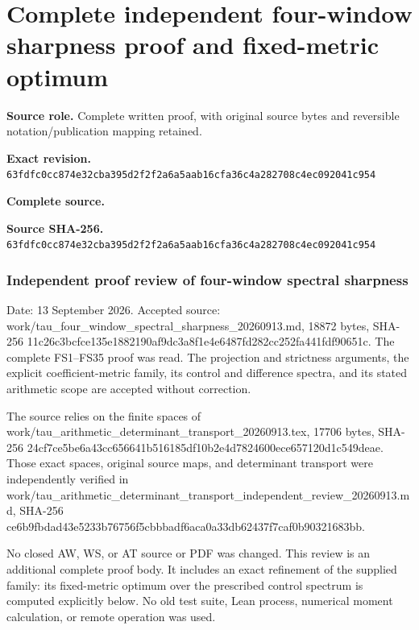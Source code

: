 \begingroup

\section{Complete independent four-window sharpness proof and fixed-metric optimum}


\begingroup
\sloppy
\small

\noindent\textbf{Source role.} Complete written proof, with original source bytes and reversible notation/publication mapping retained.\par
\noindent\textbf{Exact revision.} \nolinkurl{63fdfc0cc874e32cba395d2f2f2a6a5aab16cfa36c4a282708c4ec092041c954}\par
\noindent\textbf{Complete source.} \par
\noindent\textbf{Source SHA-256.} \nolinkurl{63fdfc0cc874e32cba395d2f2f2a6a5aab16cfa36c4a282708c4ec092041c954}\par\medskip
\subsubsection{Independent proof review of four-window spectral sharpness}\label{endpoint-four_window_sharpness_review--independent-proof-review-of-four-window-spectral-sharpness}

Date: 13 September 2026. Accepted source: work/tau\_four\_window\_spectral\_sharpness\_20260913.md, 18872 bytes, SHA-256 11c26c3bcfce135e1882190af9dc3a8f1e4e6487fd282cc252fa441fdf90651c. The complete FS1--FS35 proof was read. The projection and strictness arguments, the explicit coefficient-metric family, its control and difference spectra, and its stated arithmetic scope are accepted without correction.

The source relies on the finite spaces of work/tau\_arithmetic\_determinant\_transport\_20260913.tex, 17706 bytes, SHA-256 24cf7ce5be6a43cc656641b516185df10b2e4d7824600ece657120d1c549deae. Those exact spaces, original source maps, and determinant transport were independently verified in work/tau\_arithmetic\_determinant\_transport\_independent\_review\_20260913.md, SHA-256 ce6b9fbdad43e5233b76756f5cbbbadf6aca0a33db62437f7caf0b90321683bb.

No closed AW, WS, or AT source or PDF was changed. This review is an additional complete proof body. It includes an exact refinement of the supplied family: its fixed-metric optimum over the prescribed control spectrum is computed explicitly below. No old test suite, Lean process, numerical moment calculation, or remote operation was used.

